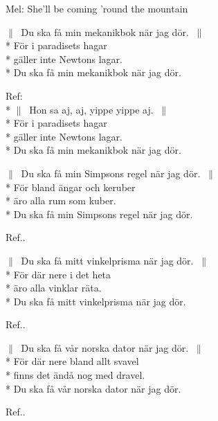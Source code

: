 \begin{SongText}
    \begin{SongInfo}
        Mel: She'll be coming 'round the mountain
    \end{SongInfo}
    \begin{SongVerse}
        $\|\:$ Du ska få min mekanikbok när jag dör. $\:\|$\\*%
        För i paradisets hagar\\*%
        gäller inte Newtons lagar.\\*%
        Du ska få min mekanikbok när jag dör.
    \end{SongVerse}
    \begin{SongVerse}
        Ref:\\*%
        $\|\:$ Hon sa aj, aj, yippe yippe aj. $\:\|$\\*%
        För i paradisets hagar\\*%
        gäller inte Newtons lagar.\\*%
        Du ska få min mekanikbok när jag dör.
    \end{SongVerse}
    \begin{SongVerse}
        $\|\:$ Du ska få min Simpsons regel när jag dör. $\:\|$\\*%
        För bland ängar och keruber\\*%
        äro alla rum som kuber.\\*%
        Du ska få min Simpsons regel när jag dör.
    \end{SongVerse}
    \begin{SongVerse}
        Ref..
    \end{SongVerse}
    \begin{SongVerse}
        $\|\:$ Du ska få mitt vinkelprisma när jag dör. $\:\|$\\*%
        För där nere i det heta\\*%
        äro alla vinklar räta.\\*%
        Du ska få mitt vinkelprisma när jag dör.
    \end{SongVerse}
    \begin{SongVerse}
        Ref..
    \end{SongVerse}
    \begin{SongVerse}
        $\|\:$ Du ska få vår norska dator när jag dör. $\:\|$\\*%
        För där nere bland allt svavel\\*%
        finns det ändå nog med dravel.\\*%
        Du ska få vår norska dator när jag dör.
    \end{SongVerse}
    \begin{SongVerse}
        Ref..
    \end{SongVerse}
\end{SongText}
